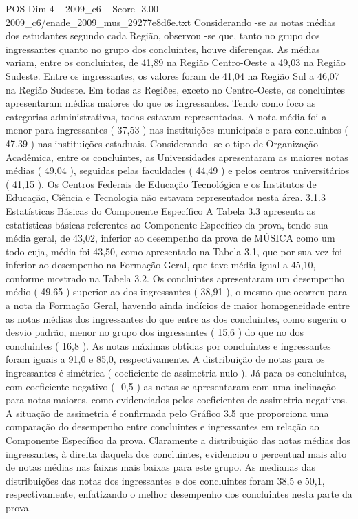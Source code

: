 \begin{textsample}{POS Dim 4 – 2009\_c6 – Score -3.00 – 2009\_c6/enade\_2009\_mus\_29277e8d6e.txt}
Considerando -se as notas médias dos estudantes segundo cada Região, observou -se que, tanto no grupo dos ingressantes quanto no grupo dos concluintes, houve diferenças.
As médias variam, entre os concluintes, de 41,89 na Região Centro-Oeste a 49,03 na Região Sudeste.
Entre os ingressantes, os valores foram de 41,04 na Região Sul a 46,07 na Região Sudeste.
Em todas as Regiões, exceto no Centro-Oeste, os concluintes apresentaram médias maiores do que os ingressantes.
Tendo como foco as categorias administrativas, todas estavam representadas.
A nota média foi a menor para ingressantes ( 37,53 ) nas instituições municipais e para concluintes ( 47,39 ) nas instituições estaduais.
Considerando -se o tipo de Organização Acadêmica, entre os concluintes, as Universidades apresentaram as maiores notas médias ( 49,04 ), seguidas pelas faculdades ( 44,49 ) e pelos centros universitários ( 41,15 ).
Os Centros Federais de Educação Tecnológica e os Institutos de Educação, Ciência e Tecnologia não estavam representados nesta área. 3.1.3 Estatísticas Básicas do Componente Específico A Tabela 3.3 apresenta as estatísticas básicas referentes ao Componente Específico da prova, tendo sua média geral, de 43,02, inferior ao desempenho da prova de MÚSICA como um todo cuja, média foi 43,50, como apresentado na Tabela 3.1, que por sua vez foi inferior ao desempenho na Formação Geral, que teve média igual a 45,10, conforme mostrado na Tabela 3.2.
Os concluintes apresentaram um desempenho médio ( 49,65 ) superior ao dos ingressantes ( 38,91 ), o mesmo que ocorreu para a nota da Formação Geral, havendo ainda indícios de maior homogeneidade entre as notas médias dos ingressantes do que entre as dos concluintes, como sugeriu o desvio padrão, menor no grupo dos ingressantes ( 15,6 ) do que no dos concluintes ( 16,8 ).
As notas máximas obtidas por concluintes e ingressantes foram iguais a 91,0 e 85,0, respectivamente.
A distribuição de notas para os ingressantes é simétrica ( coeficiente de assimetria nulo ).
Já para os concluintes, com coeficiente negativo ( -0,5 ) as notas se apresentaram com uma inclinação para notas maiores, como evidenciados pelos coeficientes de assimetria negativos.
A situação de assimetria é confirmada pelo Gráfico 3.5 que proporciona uma comparação do desempenho entre concluintes e ingressantes em relação ao Componente Específico da prova.
Claramente a distribuição das notas médias dos ingressantes, à direita daquela dos concluintes, evidenciou o percentual mais alto de notas médias nas faixas mais baixas para este grupo.
As medianas das distribuições das notas dos ingressantes e dos concluintes foram 38,5 e 50,1, respectivamente, enfatizando o melhor desempenho dos concluintes nesta parte da prova.

\end{textsample}
